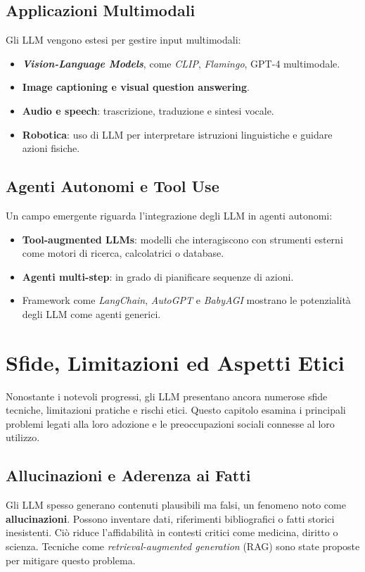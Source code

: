 \subsection{Applicazioni Multimodali}
Gli LLM vengono estesi per gestire input multimodali:
\begin{itemize}
    \item \textbf{\textit{Vision-Language Models}}, come \textit{CLIP}, \textit{Flamingo}, GPT-4 multimodale.
    \item \textbf{Image captioning e visual question answering}.
    \item \textbf{Audio e speech}: trascrizione, traduzione e sintesi vocale.
    \item \textbf{Robotica}: uso di LLM per interpretare istruzioni linguistiche e guidare azioni fisiche.
\end{itemize}

\subsection{Agenti Autonomi e Tool Use}
Un campo emergente riguarda l'integrazione degli LLM in agenti autonomi:
\begin{itemize}
    \item \textbf{Tool-augmented LLMs}: modelli che interagiscono con strumenti esterni 
    come motori di ricerca, calcolatrici o database.
    \item \textbf{Agenti multi-step}: in grado di pianificare sequenze di azioni.
    \item Framework come \textit{LangChain}, \textit{AutoGPT} e \textit{BabyAGI} mostrano 
    le potenzialità degli LLM come agenti generici.
\end{itemize}

\newpage
\section{Sfide, Limitazioni ed Aspetti Etici}

Nonostante i notevoli progressi, gli LLM presentano ancora
numerose sfide tecniche, limitazioni pratiche e rischi etici.
Questo capitolo esamina i principali problemi legati alla loro adozione
e le preoccupazioni sociali connesse al loro utilizzo.

\subsection{Allucinazioni e Aderenza ai Fatti}
Gli LLM spesso generano contenuti plausibili ma falsi, un fenomeno noto come \textbf{allucinazioni}.
Possono inventare dati, riferimenti bibliografici o fatti storici inesistenti. Ciò riduce l'affidabilità in contesti critici 
come medicina, diritto o scienza. Tecniche come \textit{\textit{retrieval-augmented generation}} (RAG) sono state proposte per mitigare questo problema.

